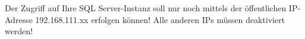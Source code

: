 \item Der Zugriff auf Ihre SQL Server-Instanz soll nur noch mittels der 
öffentlichen IP-Adresse 192.168.111.xx erfolgen können! Alle anderen IPs
müssen deaktiviert werden!
